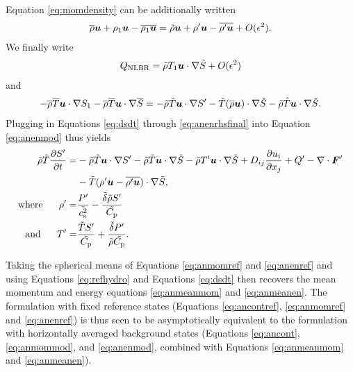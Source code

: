 \documentclass[12pt]{article}
\newcommand{\vecf}{\bm{F}}
\begin{document}
Equation \eqref{eq:momdensity} can be additionally written
  \begin{align}\label{eq:momdensity2}
\overline{\rho}\bm{u} + \rho_1\bm{u} - \overline{\rho_1\bm{u}} = \tilde{\rho}\bm{u} + \rho^\prime\bm{u} - \overline{\rho^\prime\bm{u}} + O(\epsilon^2).
\end{align}
We finally write 
\begin{align}
	Q_{\rm NLBR} = \tilde{\rho}T_1\bm{u}\cdot\nabla\tilde{S} + O(\epsilon^2)
\end{align}
and 
\begin{align}\label{eq:anenrhsfinal}
	-\overline{\rho}\overline{T} \bm{u}\cdot\nabla S_1 - \overline{\rho}\overline{T} \bm{u}\cdot\nabla\overline{S} = -\tilde{\rho}\tilde{T}\bm{u}\cdot\nabla S^\prime - \tilde{T}(\overline{\rho} \bm{u})\cdot\nabla\tilde{S} - \tilde{\rho}\hat{T}\bm{u}\cdot\nabla\tilde{S}.
\end{align}
Plugging in Equations \eqref{eq:dsdt} through \eqref{eq:anenrhsfinal} into Equation \eqref{eq:anenmod} thus yields
\begin{subequations}\label{eq:anenref}
	\begin{align}
		\tilde{\rho}\tilde{T}\pderiv{S^\prime}{t}= &-\tilde{\rho}\tilde{T}\ugrad S^\prime - \tilde{\rho}\tilde{T} \ugrad \tilde{S} - \tilde{\rho} T^\prime\ugrad\tilde{S}+D_{ij}\pderiv{u_i}{x_j} + Q^\prime- \Div\vecf^\prime  \nonumber\\
		& - \tilde{T}(\rho^\prime \vecu-\overline{\rho^\prime\vecu})\cdot\nabla\tilde{S},\label{eq:anenrefmain}\\
		\where \rho^\prime =& \frac{P^\prime}{\tilde{\cs^2}}-\frac{\tilde{\delta}\tilde{\rho}S ^\prime}{\tilde{\cpcap}}\\
		\andd T^\prime = & \frac{\tilde{T} S^\prime}{\tilde{\cpcap}} + \frac{\tilde{\delta} P^\prime}{\tilde{\rho}\tilde{\cpcap}}.
	\end{align}
\end{subequations}

Taking the spherical means of Equations \eqref{eq:anmomref} and \eqref{eq:anenref} and using Equations \eqref{eq:refhydro} and Equations \eqref{eq:dsdt} then recovers the mean momentum and energy equations \eqref{eq:anmeanmom} and \eqref{eq:anmeanen}. The formulation with fixed reference states (Equations \eqref{eq:ancontref}, \eqref{eq:anmomref} and \eqref{eq:anenref}) is thus seen to be asymptotically equivalent to the formulation with horizontally averaged background states (Equations \eqref{eq:ancont}, \eqref{eq:anmommod}, and \eqref{eq:anenmod}, combined with Equations \eqref{eq:anmeanmom} and \eqref{eq:anmeanen}). 
\end{document}
